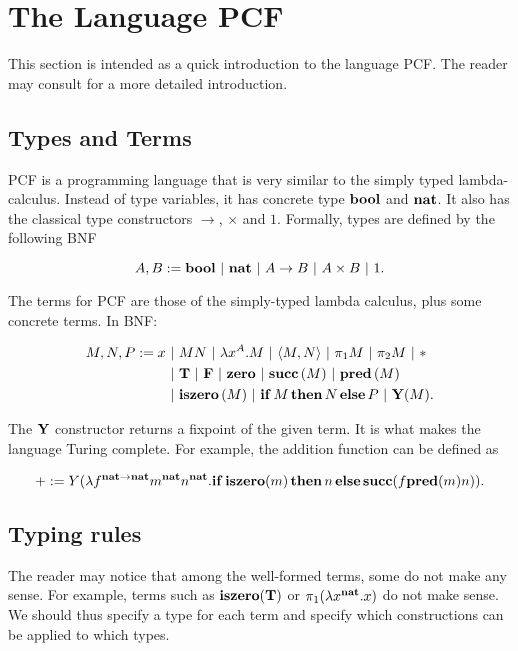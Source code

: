 
\section{The Language PCF}

This section is intended as a quick introduction to the language PCF. The reader may consult \cite{LambdaNotes} for a more detailed introduction.

\subsection{Types and Terms}

PCF is a programming language that is very similar to the simply typed lambda-calculus. Instead of type variables, it has concrete type $\mathbf{bool}$ and $\mathbf{nat}$. It also has the classical type constructors $\to$, $\times$ and $1$. Formally, types are defined by the following BNF

\[ A, B := \mathbf{bool} \ \mathbf{|}\  \mathbf{nat} \ \mathbf{|}\  A\to B \ \mathbf{|}\  A\times B \ \mathbf{|}\  1. \]

The terms for PCF are those of the simply-typed lambda calculus, plus some concrete terms. In BNF:

\begin{align*}
    M, N, P := x &\ \mathbf{|}\  MN \ \mathbf{|}\  \lambda x^A.M \ \mathbf{|}\  \langle M, N\rangle \ \mathbf{|}\  \pi_1M \ \mathbf{|}\  \pi_2M \ \mathbf{|}\  * \\
    &\ \mathbf{|}\  \mathbf{T} \ \mathbf{|}\  \mathbf{F} \ \mathbf{|}\  \mathbf{zero} \ \mathbf{|}\  \mathbf{succ}\,(M) \ \mathbf{|}\  \mathbf{pred}\,(M) \\
    &\ \mathbf{|}\  \mathbf{iszero}\,(M) \ \mathbf{|}\  \mathbf{if}\,M\,\mathbf{then}\,N\,\mathbf{else}\,P \ \mathbf{|}\  \mathbf{Y}(M).
\end{align*}

The $\mathbf{Y}$ constructor returns a fixpoint of the given term. It is what makes the language Turing complete. For example, the addition function can be defined as

\[ + := Y(\lambda f^{\mathbf{nat}\to\mathbf{nat}}m^\mathbf{nat}n^\mathbf{nat}.\mathbf{if}\,\mathbf{iszero}(m)\,\mathbf{then}\,n\,\mathbf{else}\,\mathbf{succ}(f \mathbf{pred}(m) n)). \]

\subsection{Typing rules}

The reader may notice that among the well-formed terms, some do not make any sense. For example, terms such as $\mathbf{iszero}(\mathbf{T})$ or $\pi_1(\lambda x^\mathbf{nat}.x)$ do not make sense. We should thus specify a type for each term and specify which constructions can be applied to which types.



